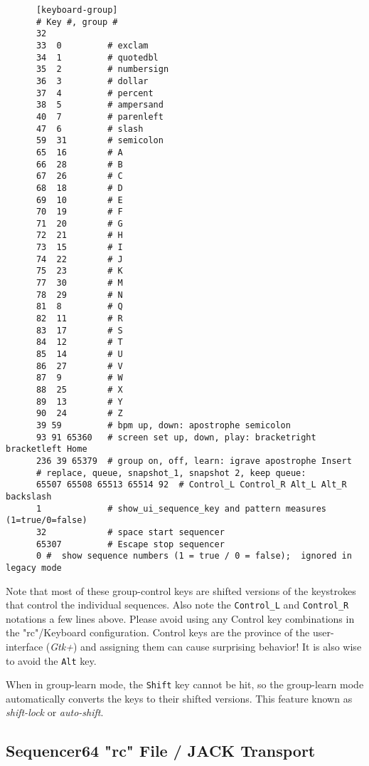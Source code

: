    \begin{verbatim}
      [keyboard-group]
      # Key #, group # 
      32
      33  0         # exclam
      34  1         # quotedbl
      35  2         # numbersign
      36  3         # dollar
      37  4         # percent
      38  5         # ampersand
      40  7         # parenleft
      47  6         # slash
      59  31        # semicolon
      65  16        # A
      66  28        # B
      67  26        # C
      68  18        # D
      69  10        # E
      70  19        # F
      71  20        # G
      72  21        # H
      73  15        # I
      74  22        # J
      75  23        # K
      77  30        # M
      78  29        # N
      81  8         # Q
      82  11        # R
      83  17        # S
      84  12        # T
      85  14        # U
      86  27        # V
      87  9         # W
      88  25        # X
      89  13        # Y
      90  24        # Z
      39 59         # bpm up, down: apostrophe semicolon
      93 91 65360   # screen set up, down, play: bracketright bracketleft Home
      236 39 65379  # group on, off, learn: igrave apostrophe Insert
      # replace, queue, snapshot_1, snapshot 2, keep queue:
      65507 65508 65513 65514 92  # Control_L Control_R Alt_L Alt_R backslash
      1             # show_ui_sequence_key and pattern measures (1=true/0=false)
      32            # space start sequencer
      65307         # Escape stop sequencer
      0 #  show sequence numbers (1 = true / 0 = false);  ignored in legacy mode
   \end{verbatim}

   Note that most of these group-control keys are shifted versions of the
   keystrokes that control the individual sequences.  Also note the
   \texttt{Control\_L} and \texttt{Control\_R} notations a few lines above.
   Please avoid using any Control key combinations in the "rc"/Keyboard
   configuration.  Control keys are the province of the user-interface
   (\textsl{Gtk+}) and assigning them can cause surprising behavior!
   It is also wise to avoid the \texttt{Alt} key.

   When in group-learn mode, the \texttt{Shift} key cannot be hit, so the
   group-learn mode automatically converts the keys to their shifted versions.
   This feature known as \textsl{shift-lock} or \textsl{auto-shift}.

\subsection{Sequencer64 "rc" File / JACK Transport}
\label{subsec:seq64_rc_file_jack_transport}


